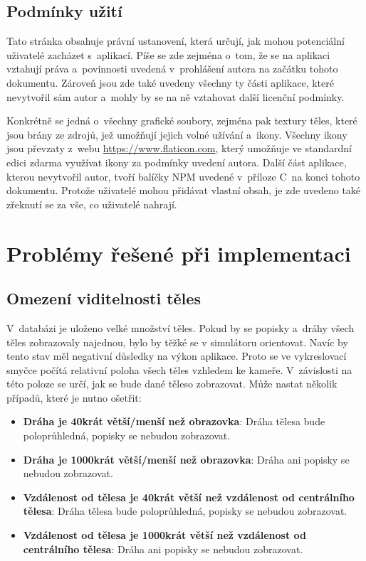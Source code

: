 \documentclass[a4paper,12pt]{article}
\begin{document}
\subsection{Podmínky užití}

Tato stránka obsahuje právní ustanovení, která určují, jak mohou potenciální uživatelé zacházet s~aplikací. Píše se zde zejména o~tom, že se na aplikaci vztahují práva a~povinnosti uvedená v~prohlášení autora na začátku tohoto dokumentu. Zároveň jsou zde také uvedeny všechny ty části aplikace, které nevytvořil sám autor a~mohly by se na ně vztahovat další licenční podmínky.

Konkrétně se jedná o~všechny grafické soubory, zejména pak textury těles, které jsou brány ze zdrojů, jež umožňují jejich volné užívání a~ikony. Všechny ikony jsou převzaty z~webu \url{https://www.flaticon.com}, který umožňuje ve standardní edici zdarma využívat ikony za podmínky uvedení autora. Další část aplikace, kterou nevytvořil autor, tvoří balíčky NPM uvedené v~příloze C~na konci tohoto dokumentu. Protože uživatelé mohou přidávat vlastní obsah, je zde uvedeno také zřeknutí se za vše, co uživatelé nahrají.

\section{Problémy řešené při implementaci}

\subsection{Omezení viditelnosti těles}

V~databázi je uloženo velké množství těles. Pokud by se popisky a~dráhy všech těles zobrazovaly najednou, bylo by těžké se v simulátoru orientovat. Navíc by tento stav měl negativní důsledky na výkon aplikace. Proto se ve vykreslovací smyčce počítá relativní poloha všech těles vzhledem ke kameře. V~závislosti na této poloze se určí, jak se bude dané těleso zobrazovat. Může nastat několik případů, které je nutno ošetřit:

\begin{itemize}
\item \textbf{Dráha je 40krát větší/menší než obrazovka}: Dráha tělesa bude poloprůhledná, popisky se nebudou zobrazovat.
\item \textbf{Dráha je 1000krát větší/menší než obrazovka}: Dráha ani popisky se nebudou zobrazovat.
\item \textbf{Vzdálenost od tělesa je 40krát větší než vzdálenost od centrálního tělesa}: Dráha tělesa bude poloprůhledná, popisky se nebudou zobrazovat.
\item \textbf{Vzdálenost od tělesa je 1000krát větší než vzdálenost od centrálního tělesa}: Dráha ani popisky se nebudou zobrazovat.
\end{itemize} 
\end{document}
